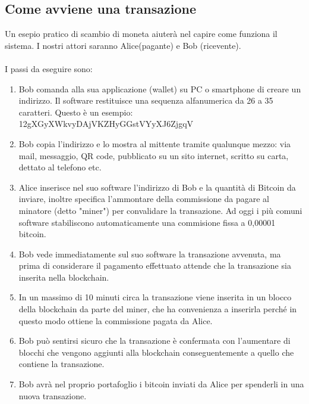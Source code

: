 \subsection{Come avviene una transazione}
\label{sec:come avviene una transazione}
Un esepio pratico di scambio di moneta aiuterà nel capire come funziona il sistema. I nostri attori saranno Alice(pagante) e Bob (ricevente).
\\
\\I passi da eseguire sono:
\begin{enumerate}\itemsep2pt

\item Bob comanda alla sua applicazione (wallet) su PC o smartphone di creare un indirizzo. Il software restituisce una sequenza alfanumerica da 26 a 35 caratteri. Questo è un esempio: 12gXGyXWkvyDAjVKZHyGGstVYyXJ6ZjgqV

\item Bob copia l'indirizzo e lo mostra al mittente tramite qualunque mezzo: via mail, messaggio, QR code, pubblicato su un sito internet, scritto su carta, dettato al telefono etc.

\item Alice inserisce nel suo software l'indirizzo di Bob e la quantità di Bitcoin da inviare, inoltre specifica l'ammontare della commissione da pagare al minatore (detto "miner") per convalidare la transazione. Ad oggi i più comuni software stabiliscono automaticamente una commisione fissa a 0,00001 bitcoin.

\item Bob vede immediatamente sul suo software la transazione avvenuta, ma prima di considerare il pagamento effettuato attende che la transazione sia inserita nella blockchain.

\item In un massimo di 10 minuti circa la transazione viene inserita in un blocco della blockchain da parte del miner, che ha convenienza a inserirla perché in questo modo ottiene la commissione pagata da Alice.

\item Bob può sentirsi sicuro che la transazione è confermata con l’aumentare di blocchi che vengono aggiunti alla blockchain conseguentemente a quello che contiene la transazione. 

\item Bob avrà nel proprio portafoglio i bitcoin inviati da Alice per spenderli in una nuova transazione.
\end{enumerate}

